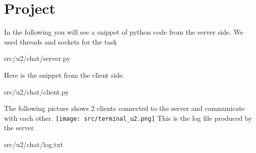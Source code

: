 \newpage
\section{Project}
In the following you will see a snippet of python code from the server side.
\newline We used threads and sockets for the task
											
{src/u2/chat/server.py}

\newpage
Here is the snippet from the client side.
	
{src/u2/chat/client.py}

The following picture shows 2 clients connected to the server and communicate with each other.
\newline\texttt{[image: src/terminal\_u2.png]}
This is the log file produced by the server.
	
{src/u2/chat/log.txt}



